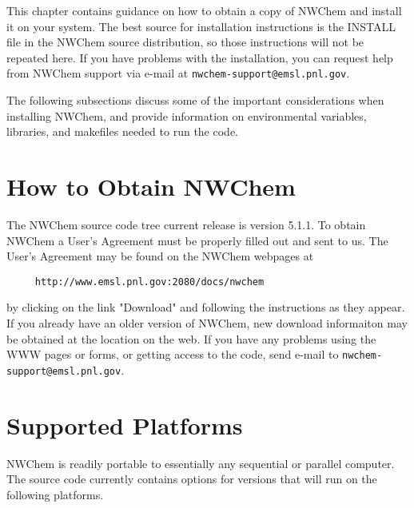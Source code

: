 \label{sec:install}

This chapter contains guidance on how to obtain a copy of NWChem and
install it on your system.   The best source for installation instructions
is the INSTALL file in the NWChem source distribution, so those
instructions will not be repeated here.  If you have problems with the
installation, you can request help from NWChem 
support via e-mail at {\tt nwchem-support@emsl.pnl.gov}.

The following subsections discuss some of the important considerations
when installing NWChem, and provide information on environmental
variables, libraries, and makefiles needed to run the code.

\section{How to Obtain NWChem}

The NWChem source code tree current release is version 5.1.1.  To obtain NWChem
a User's Agreement must be properly filled out and sent to us.  The User's
Agreement may be found on the NWChem webpages at

\begin{verbatim}
     http://www.emsl.pnl.gov:2080/docs/nwchem
\end{verbatim}

by clicking on the link "Download" and following the
instructions as they appear.  If you already have an older version of NWChem,
new download informaiton may be obtained at the location on the web.
If you have any problems
using the WWW pages or forms, or getting access to the code, send e-mail to
{\tt nwchem-support@emsl.pnl.gov}.

\section{Supported Platforms}
\label{sec:platforms}
NWChem is readily portable to essentially any sequential or parallel computer.  
The source code currently contains options for versions that will run
on the following platforms.

